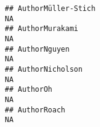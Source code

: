 \documentclass[]{article}
\begin{document}
\begin{verbatim}
## AuthorMüller-Stich                                                                                                                                                                                                                                                                                                                                                                                                                                                                   NA
## AuthorMurakami                                                                                                                                                                                                                                                                                                                                                                                                                                                                       NA
## AuthorNguyen                                                                                                                                                                                                                                                                                                                                                                                                                                                                         NA
## AuthorNicholson                                                                                                                                                                                                                                                                                                                                                                                                                                                                      NA
## AuthorOh                                                                                                                                                                                                                                                                                                                                                                                                                                                                             NA
## AuthorRoach                                                                                                                                                                                                                                                                                                                                                                                                                                                                          NA

\end{verbatim}
\end{document}
